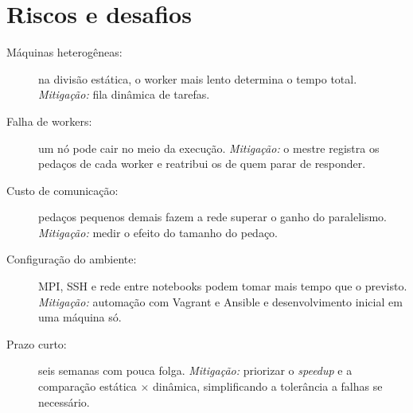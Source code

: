 \section{Riscos e desafios}

\begin{description}
  \item[Máquinas heterogêneas:] na divisão estática, o worker mais lento
    determina o tempo total. \emph{Mitigação:} fila dinâmica de tarefas.
  \item[Falha de workers:] um nó pode cair no meio da execução.
    \emph{Mitigação:} o mestre registra os pedaços de cada worker e
    reatribui os de quem parar de responder.
  \item[Custo de comunicação:] pedaços pequenos demais fazem a rede
    superar o ganho do paralelismo. \emph{Mitigação:} medir o efeito do
    tamanho do pedaço.
  \item[Configuração do ambiente:] MPI, SSH e rede entre notebooks podem
    tomar mais tempo que o previsto. \emph{Mitigação:} automação com
    Vagrant e Ansible e desenvolvimento inicial em uma máquina só.
  \item[Prazo curto:] seis semanas com pouca folga. \emph{Mitigação:}
    priorizar o \emph{speedup} e a comparação estática $\times$ dinâmica,
    simplificando a tolerância a falhas se necessário.
\end{description}
